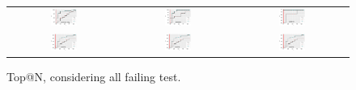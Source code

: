 \documentclass[sigplan,10pt,review,anonymous]{acmart}\settopmatter{printfolios=true,printccs=false,printacmref=false}
\begin{document}
\begin{figure}[!ht]
\begin{tabular}{cl|rrrrrrrrrr}
      \multicolumn{2}{c}{\includegraphics[width=0.25\textwidth]{R/commons-lang-allfailingtest-filtering.pdf}}
      &
      \multicolumn{5}{c}{\includegraphics[width=0.25\textwidth]{R/jfreechart-allfailingtest-filtering.pdf}}
      &
      \multicolumn{5}{c}{\includegraphics[width=0.25\textwidth]{R/jodatime-allfailingtest-filtering.pdf}}\\

      \multicolumn{2}{c}{\includegraphics[width=0.25\textwidth]{R/mockito-allfailingtest-filtering.pdf}}
      &
      \multicolumn{5}{c}{\includegraphics[width=0.25\textwidth]{R/mockito-allfailingtest-filtering.pdf}}
      &
      \multicolumn{5}{c}{\includegraphics[width=0.25\textwidth]{R/mockito-allfailingtest-filtering.pdf}}\\
      \bottomrule

    \end{tabular}
    \caption{\label{fig:all-failing-test}Top@N, considering all failing test.}
\end{figure}
\end{document}
